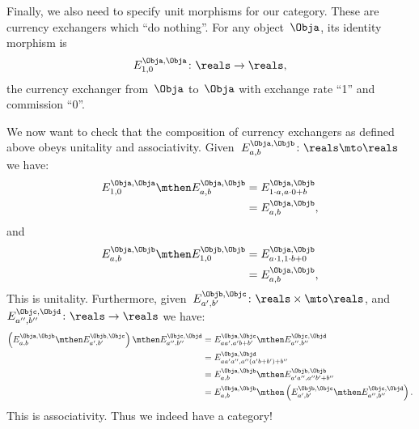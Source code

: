 Finally, we also need to specify unit morphisms for our category.
These are currency exchangers which ``do nothing''.
For any object~$\Obja$, its identity morphism is
\begin{equation*}
    E_{1,0}^{\Obja,\Obja} \colon \reals \to \reals,
\end{equation*}
the currency exchanger from~$\Obja$ to~$\Obja$ with exchange rate ``1'' and commission ``0''.

We now want to check that the composition of currency exchangers as defined above obeys unitality and associativity.
Given~$E_{a,b}^{\Obja,\Objb}\colon \reals \mto \reals$ we have:
\begin{equation*}
    \begin{aligned}
        E_{1,0}^{\Obja,\Obja}\mthen E_{a,b}^{\Obja,\Objb}&=E_{1\cdot a, a\cdot 0+b}^{\Obja,\Objb}\\
        &=E_{a,b}^{\Obja,\Objb},
    \end{aligned}
\end{equation*}
and
\begin{equation*}
    \begin{aligned}
        E_{a,b}^{\Obja,\Objb}\mthen E_{1,0}^{\Objb,\Objb}&=E_{a\cdot 1, 1\cdot b+0}^{\Obja,\Objb}\\
        &=E_{a,b}^{\Obja,\Objb},
    \end{aligned}
\end{equation*}
This is unitality.
Furthermore, given~$E_{a',b'}^{\Objb,\Objc}\colon \reals \times \mto \reals$, and~$E_{a'',b''}^{\Objc,\Objd}\colon \reals \to \reals$ we have:
\begin{equation*}
    \begin{aligned}
        \left( E_{a,b}^{\Obja,\Objb}\mthen E_{a',b'}^{\Objb,\Objc}\right)\mthen E_{a'',b''}^{\Objc,\Objd}&=E_{aa',a'b+b'}^{\Obja,\Objc}\mthen E_{a'',b''}^{\Objc,\Objd}\\
        &=E_{aa'a'',a''(a'b+b')+b''}^{\Obja,\Objd}\\
        &=E_{a,b}^{\Obja,\Objb}\mthen E_{a'a'',a''b'+b''}^{\Objb,\Objb}\\
        &=E_{a,b}^{\Obja,\Objb}\mthen \left( E_{a',b'}^{\Objb,\Objc}\mthen E_{a'',b''}^{\Objc,\Objd}\right).
    \end{aligned}
\end{equation*}
This is associativity. Thus we indeed have a category!

